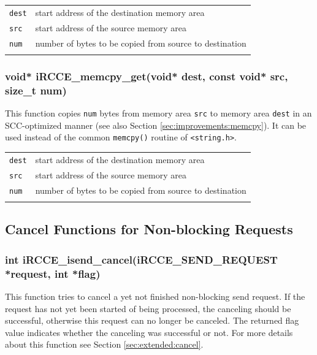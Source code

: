 \documentclass[fontsize=10pt, paper=a4, DIV12, pagesize=auto]{scrartcl}
\begin{document}
\begin{tabular}{ll}
\texttt{dest} & start address of the destination memory area \\
\texttt{src}  & start address of the source memory area \\
\texttt{num}  & number of bytes to be copied from source to destination \\
\hspace{2.0cm}
\end{tabular}


\subsubsection{void* iRCCE\_memcpy\_get(void* dest, const void* src, size\_t num)}\vspace{-0.3cm}
This function copies \texttt{num} bytes from memory area \texttt{src} to memory area \texttt{dest} in an SCC-optimized manner (see also Section \ref{sec:improvements:memcpy}).
It can be used instead of the common \texttt{memcpy()} routine of \texttt{<string.h>}.

\begin{tabular}{ll}
\texttt{dest} & start address of the destination memory area \\
\texttt{src}  & start address of the source memory area \\
\texttt{num}  & number of bytes to be copied from source to destination \\
\hspace{2.0cm}
\end{tabular}


\subsection{Cancel Functions for Non-blocking Requests}

\subsubsection{int iRCCE\_isend\_cancel(iRCCE\_SEND\_REQUEST *request, int *flag)}\vspace{-0.3cm}
This function tries to cancel a yet not finished non-blocking send request.
If the request has not yet been started of being processed, the canceling should be successful, otherwise this request can no longer be canceled.
The returned flag value indicates whether the canceling was successful or not.
For more details about this function see Section \ref{sec:extended:cancel}.
\end{document}
